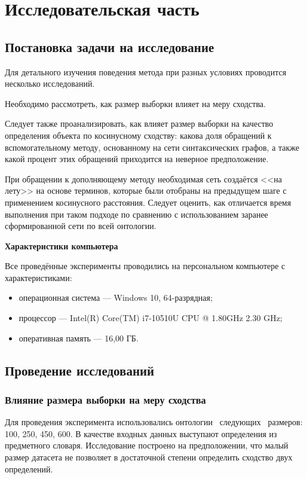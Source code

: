 \section{Исследовательская часть}
\subsection{Постановка задачи на исследование}
Для детального изучения поведения метода при разных условиях проводится несколько исследований.

Необходимо рассмотреть, как размер выборки влияет на меру сходства.

Следует также проанализировать, как влияет размер выборки на качество определения объекта по косинусному сходству: какова доля обращений к вспомогательному методу, основанному на сети синтаксических графов, а также какой процент этих обращений приходится на неверное предположение.

При обращении к дополняющему методу необходимая сеть создаётся <<на лету>> на основе терминов, которые были отобраны на предыдущем шаге с применением косинусного расстояния. Следует оценить, как отличается время выполнения при таком подходе по сравнению с использованием заранее сформированной сети по всей онтологии. \newline

\textbf{Характеристики компьютера}

Все проведённые эксперименты проводились на персональном компьютере с характеристиками:
\begin{itemize}
	\item операционная система --- Windows 10, 64-разрядная;
	\item процессор --- Intel(R) Core(TM) i7-10510U CPU @ 1.80GHz 2.30 GHz;
	\item оперативная память --- 16,00 ГБ. \\
\end{itemize}

\subsection{Проведение исследований}

\subsubsection{Влияние размера выборки на меру сходства}
Для проведения эксперимента использовались онтологии \, следующих \, размеров: 100, 250, 450, 600. В качестве входных данных выступают определения из предметного словаря.  Исследование построено на предположении, что малый размер датасета не позволяет в достаточной степени определить сходство двух определений.


